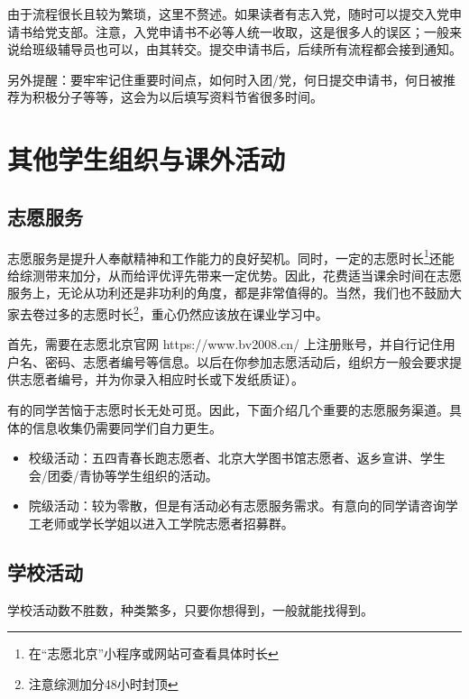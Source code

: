 \documentclass[11pt,oneside]{book}
\begin{document}
\vspace{10pt}

由于流程很长且较为繁琐，这里不赘述。如果读者有志入党，随时可以提交入党申请书给党支部。注意，入党申请书不必等人统一收取，这是很多人的误区；一般来说给班级辅导员也可以，由其转交。提交申请书后，后续所有流程都会接到通知。

\vspace{10pt}

另外提醒：要牢牢记住重要时间点，如何时入团/党，何日提交申请书，何日被推荐为积极分子等等，这会为以后填写资料节省很多时间。

\section{其他学生组织与课外活动}
\subsection{志愿服务}

志愿服务是提升人奉献精神和工作能力的良好契机。同时，一定的志愿时长\footnote{在“志愿北京”小程序或网站可查看具体时长}还能给综测带来加分，从而给评优评先带来一定优势。因此，花费适当课余时间在志愿服务上，无论从功利还是非功利的角度，都是非常值得的。当然，我们也不鼓励大家去卷过多的志愿时长\footnote{注意综测加分48小时封顶}，重心仍然应该放在课业学习中。

\vspace{10pt}

首先，需要在志愿北京官网 https://www.bv2008.cn/ 上注册账号，并自行记住用户名、密码、志愿者编号等信息。以后在你参加志愿活动后，组织方一般会要求提供志愿者编号，并为你录入相应时长或下发纸质证）。

\vspace{10pt}

有的同学苦恼于志愿时长无处可觅。因此，下面介绍几个重要的志愿服务渠道。具体的信息收集仍需要同学们自力更生。
\begin{itemize}
	\item 校级活动：五四青春长跑志愿者、北京大学图书馆志愿者、返乡宣讲、学生会/团委/青协等学生组织的活动。
	\item 院级活动：较为零散，但是有活动必有志愿服务需求。有意向的同学请咨询学工老师或学长学姐以进入工学院志愿者招募群。
\end{itemize}

\subsection{学校活动}
学校活动数不胜数，种类繁多，只要你想得到，一般就能找得到。
\end{document}

